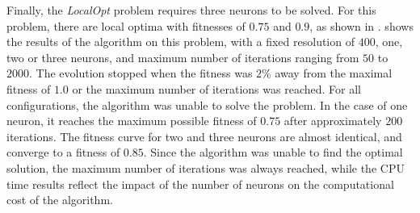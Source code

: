 Finally, the \textit{LocalOpt} problem requires three neurons to be solved. For this problem, there are local optima with fitnesses of $0.75$ and $0.9$, as shown in .
 shows the results of the algorithm on this problem, with a fixed resolution of $400$, one, two or three neurons, and maximum number of iterations ranging from $50$ to $2000$.
The evolution stopped when the fitness was $2\%$ away from the maximal fitness of $1.0$ or the maximum number of iterations was reached. For all configurations, the algorithm was unable to solve
the problem. In the case of one neuron, it reaches the maximum possible fitness of $0.75$ after approximately $200$ iterations. The fitness curve for two and three neurons are almost identical,
and converge to a fitness of $0.85$. Since the algorithm was unable to find the optimal solution, the maximum number of iterations was always reached, while the CPU time results reflect the
impact of the number of neurons on the computational cost of the algorithm.

